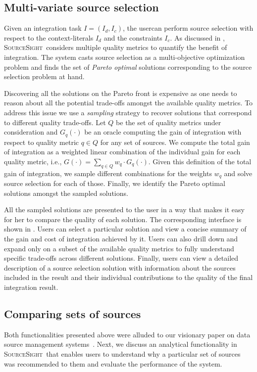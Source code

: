 \documentclass{vldb}
\newcommand\system{\textsc{SourceSight}}
\begin{document}
\subsection{Multi-variate source selection}
\label{sec:sourcesel}
Given an integration task $I = (I_d,I_c)$, the usercan perform source selection with respect to the context-literals $I_d$ and the constraints $I_c$. As discussed in , \system~considers multiple quality metrics to quantify the benefit of integration. The system casts source selection as a multi-objective optimization problem and finds the set of {\em Pareto optimal} solutions corresponding to the source selection problem at hand. 

Discovering all the solutions on the Pareto front is expensive as one needs to reason about all the potential trade-offs amongst the available quality metrics. To address this issue we use a {\em sampling} strategy to recover solutions that correspond to different quality trade-offs. Let $Q$ be the set of quality metrics under consideration and $G_q(\cdot)$ be an oracle computing the gain of integration with respect to quality metric $q \in Q$ for any set of sources. We compute the total gain of integration as a weighted linear combination of the individual gain for each quality metric, i.e., $G(\cdot) = \sum_{q \in Q} w_q \cdot G_q(\cdot)$. Given this definition of the total gain of integration, we sample different combinations for the weights $w_q$ and solve source selection for each of those. Finally, we identify the Pareto optimal solutions amongst the sampled solutions. 

All the sampled solutions are presented to the user in a way that makes it easy for her to compare the quality of each solution. The corresponding interface is shown in . Users can select a particular solution and view a concise summary of the gain and cost of integration achieved by it. Users can also drill down and expand only on a subset of the available quality metrics to fully understand specific trade-offs across different solutions. Finally, users can view a detailed description of a source selection solution with information about the sources included in the result and their individual contributions to the quality of the final integration result. 

\subsection{Comparing sets of sources}
\label{sec:extensions}
Both functionalities presented above were alluded to our visionary paper on data source management systems~\cite{rekatsinas:2015}. Next, we discuss an analytical functionality in \system~that enables users to understand why a particular set of sources was recommended to them and evaluate the performance of the system.
\end{document}
